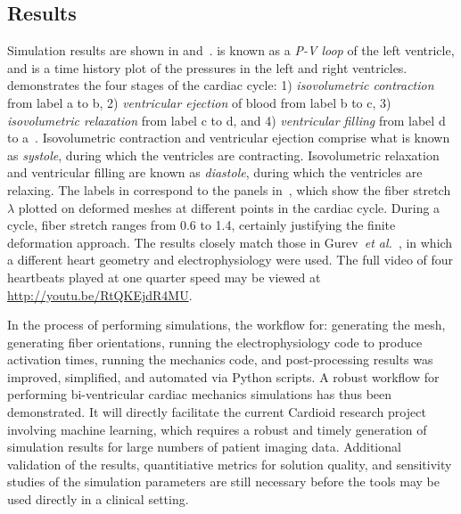 \subsection{Results}
\label{Results}

Simulation results are shown in  and~.  is known as a \textit{P-V loop} of the left ventricle, and  is a time history plot of the pressures in the left and right ventricles.  demonstrates the four stages of the cardiac cycle: 1) \textit{isovolumetric contraction} from label a to b, 2) \textit{ventricular ejection} of blood from label b to c, 3) \textit{isovolumetric relaxation} from label c to d, and 4) \textit{ventricular filling} from label d to a~\cite{slideshare}. Isovolumetric contraction and ventricular ejection comprise what is known as \textit{systole}, during which the ventricles are contracting. Isovolumetric relaxation and ventricular filling are known as \textit{diastole}, during which the ventricles are relaxing. The labels in  correspond to the panels in~, which show the fiber stretch $\lambda$ plotted on deformed meshes at different points in the cardiac cycle. During a cycle, fiber stretch ranges from 0.6 to 1.4, certainly justifying the finite deformation approach. The results closely match those in Gurev~\textit{et al.}~\cite{gurev_2015}, in which a different heart geometry and electrophysiology were used. The full video of four heartbeats played at one quarter speed may be viewed at \href{http://youtu.be/RtQKEjdR4MU}{{\url{http://youtu.be/RtQKEjdR4MU}}}.

In the process of performing simulations, the workflow for: generating the mesh, generating fiber orientations, running the electrophysiology code to produce activation times, running the mechanics code, and post-processing results was improved, simplified, and automated via Python scripts. A robust workflow for performing bi-ventricular cardiac mechanics simulations has thus been demonstrated. It will directly facilitate the current Cardioid research project involving machine learning, which requires a robust and timely generation of simulation results for large numbers of patient imaging data. Additional validation of the results, quantitiative metrics for solution quality, and sensitivity studies of the simulation parameters are still necessary before the tools may be used directly in a clinical setting.

